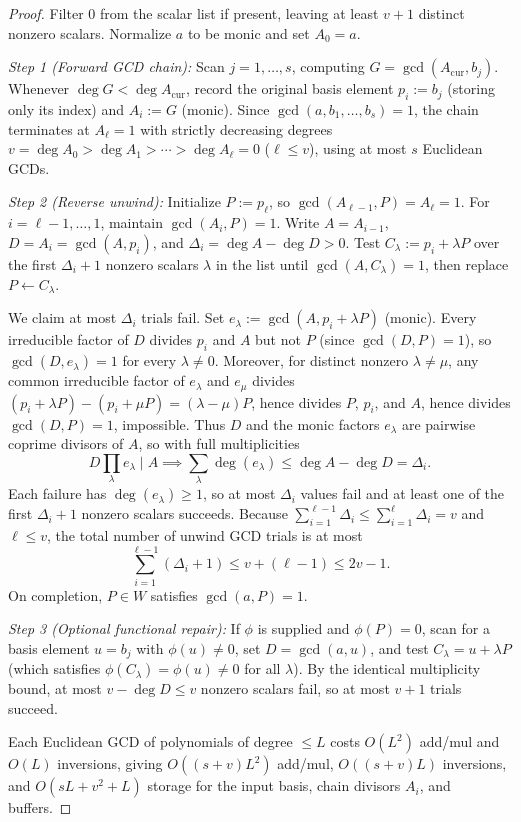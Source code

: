 \documentclass[11pt,reqno]{amsart}
\numberwithin{equation}{section}
\theoremstyle{definition}
\theoremstyle{remark}
\begin{document}
\begin{proof}
Filter $0$ from the scalar list if present, leaving at least $v+1$ distinct nonzero scalars. Normalize $a$ to be monic and set $A_0=a$.

\smallskip
\noindent\emph{Step 1 (Forward GCD chain):} Scan $j=1,\ldots,s$, computing $G=\gcd(A_{\mathrm{cur}}, b_j)$. Whenever $\deg G < \deg A_{\mathrm{cur}}$, record the original basis element $p_i := b_j$ (storing only its index) and $A_i := G$ (monic). Since $\gcd(a,b_1,\ldots,b_s)=1$, the chain terminates at $A_\ell=1$ with strictly decreasing degrees $v=\deg A_0 > \deg A_1 > \cdots > \deg A_\ell = 0$ ($\ell\le v$), using at most $s$ Euclidean GCDs.

\smallskip
\noindent\emph{Step 2 (Reverse unwind):} Initialize $P := p_\ell$, so $\gcd(A_{\ell-1}, P) = A_\ell = 1$. For $i=\ell-1,\ldots,1$, maintain $\gcd(A_i, P)=1$. Write $A=A_{i-1}$, $D=A_i=\gcd(A,p_i)$, and $\Delta_i = \deg A - \deg D > 0$. Test $C_\lambda := p_i + \lambda P$ over the first $\Delta_i+1$ nonzero scalars $\lambda$ in the list until $\gcd(A,C_\lambda)=1$, then replace $P\leftarrow C_\lambda$.

We claim at most $\Delta_i$ trials fail. Set $e_\lambda := \gcd(A, p_i+\lambda P)$ (monic). Every irreducible factor of $D$ divides $p_i$ and $A$ but not $P$ (since $\gcd(D,P)=1$), so $\gcd(D,e_\lambda)=1$ for every $\lambda\ne 0$. Moreover, for distinct nonzero $\lambda\ne\mu$, any common irreducible factor of $e_\lambda$ and $e_\mu$ divides $(p_i+\lambda P)-(p_i+\mu P)=(\lambda-\mu)P$, hence divides $P$, $p_i$, and $A$, hence divides $\gcd(D,P)=1$, impossible. Thus $D$ and the monic factors $e_\lambda$ are pairwise coprime divisors of $A$, so with full multiplicities
\[
D\prod_\lambda e_\lambda \mid A \implies \sum_\lambda \deg(e_\lambda) \le \deg A - \deg D = \Delta_i.
\]
Each failure has $\deg(e_\lambda)\ge 1$, so at most $\Delta_i$ values fail and at least one of the first $\Delta_i+1$ nonzero scalars succeeds. Because $\sum_{i=1}^{\ell-1}\Delta_i \le \sum_{i=1}^\ell \Delta_i = v$ and $\ell\le v$, the total number of unwind GCD trials is at most
\begin{equation}
\label{eq:trial-telescope}
\sum_{i=1}^{\ell-1} (\Delta_i + 1) \le v + (\ell - 1) \le 2v - 1.
\end{equation}
On completion, $P\in W$ satisfies $\gcd(a,P)=1$.

\smallskip
\noindent\emph{Step 3 (Optional functional repair):} If $\phi$ is supplied and $\phi(P)=0$, scan for a basis element $u=b_j$ with $\phi(u)\ne 0$, set $D=\gcd(a,u)$, and test $C_\lambda = u + \lambda P$ (which satisfies $\phi(C_\lambda)=\phi(u)\ne 0$ for all $\lambda$). By the identical multiplicity bound, at most $v-\deg D\le v$ nonzero scalars fail, so at most $v+1$ trials succeed.

Each Euclidean GCD of polynomials of degree $\le L$ costs $O(L^2)$ add/mul and $O(L)$ inversions, giving $O((s+v)L^2)$ add/mul, $O((s+v)L)$ inversions, and $O(sL+v^2+L)$ storage for the input basis, chain divisors $A_i$, and buffers.
\end{proof}
\end{document}
